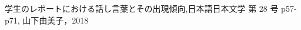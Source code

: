 \clearpage
{} %
\renewcommand{\bibname}{参考文献} %
\begin{thebibliography}{99999}
学生のレポートにおける話し言葉とその出現傾向,日本語日本文学 第 28 号 p57-p71, 
山下由美子，2018



\end{thebibliography}
